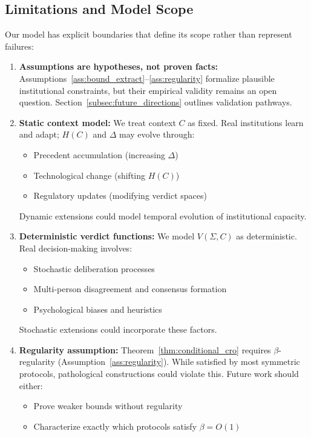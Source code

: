 \documentclass{ieeeaccess}
\begin{document}
\subsection{Limitations and Model Scope}

Our model has explicit boundaries that define its scope rather than represent failures:

\begin{enumerate}
\item \textbf{Assumptions are hypotheses, not proven facts:} Assumptions~\ref{ass:bound_extract}--\ref{ass:regularity} formalize plausible institutional constraints, but their empirical validity remains an open question. Section~\ref{subsec:future_directions} outlines validation pathways.

\item \textbf{Static context model:} We treat context $C$ as fixed. Real institutions learn and adapt; $H(C)$ and $\Delta$ may evolve through:
\begin{itemize}
\item Precedent accumulation (increasing $\Delta$)
\item Technological change (shifting $H(C)$)
\item Regulatory updates (modifying verdict spaces)
\end{itemize}
Dynamic extensions could model temporal evolution of institutional capacity.

\item \textbf{Deterministic verdict functions:} We model $V(\Sigma, C)$ as deterministic. Real decision-making involves:
\begin{itemize}
\item Stochastic deliberation processes
\item Multi-person disagreement and consensus formation
\item Psychological biases and heuristics
\end{itemize}
Stochastic extensions could incorporate these factors.

\item \textbf{Regularity assumption:} Theorem~\ref{thm:conditional_cro} requires $\beta$-regularity (Assumption~\ref{ass:regularity}). While satisfied by most symmetric protocols, pathological constructions could violate this. Future work should either:
\begin{itemize}
\item Prove weaker bounds without regularity
\item Characterize exactly which protocols satisfy $\beta = O(1)$
\end{itemize}
\end{enumerate}
\end{document}
